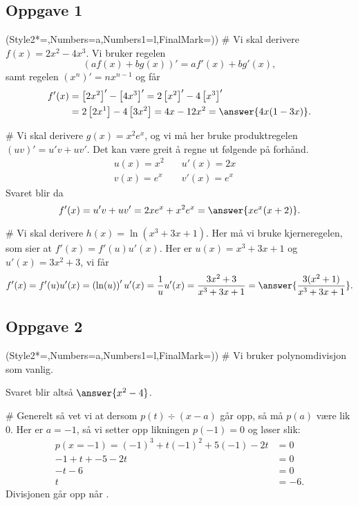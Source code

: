 \subsection*{Oppgave 1}
\begin{easylist}[enumerate]
\ListProperties(Style2*=,Numbers=a,Numbers1=l,FinalMark={)})
# Vi skal derivere $f(x) = 2x^2 - 4x^3$.
Vi bruker regelen
\begin{equation*}
	(af(x) + bg(x))' = a f'(x) + b g'(x),
\end{equation*}
samt regelen $(x^n)' = nx^{n-1}$ og får
\begin{align*}
	f'(x) &= \left[ 2x^2 \right]' - \left[ 4x^3\right]' = 
	2\left[ x^2 \right]' - 4 \left[x^3 \right]' \\ 
	&= 2\left[ 2 x^1 \right] - 4 \left[3 x^2 \right] = 
	4x - 12 x^2 = \answer{4x (1 - 3x)}.
\end{align*}

# Vi skal derivere $g(x) = x^2 e^x$, og vi må her bruke produktregelen $(uv)' = u'v + uv'$. Det kan være greit å regne ut følgende på forhånd.
\begin{align*}
	u(x) = x^2 \quad & u'(x) = 2x \quad \\ 
	v(x) = e^x \quad & v'(x) = e^x \quad 
\end{align*}
Svaret blir da
\begin{equation*}
	f'(x) = u'v + uv' = 2x e^x + x^2e^x = \answer{xe^x (x + 2)}.
\end{equation*}

# Vi skal derivere $h(x) = \ln \left(x^3 + 3x + 1\right)$.
Her må vi bruke kjerneregelen, som sier at $f'(x) = f'(u) u'(x)$.
Her er $u(x) = x^3 + 3x + 1$ og $u'(x) = 3x^2 + 3$, vi får
\begin{equation*}
	f'(x) = f'(u) u'(x) = \left( \ln (u)\right)' u'(x) = \frac{1}{u} u'(x) =
	\frac{3x^2 + 3}{x^3 + 3x + 1} = \answer{\frac{3(x^2 + 1)}{x^3 + 3x + 1}}.
\end{equation*}
\end{easylist}

\subsection*{Oppgave 2}
\begin{easylist}[enumerate]
\ListProperties(Style2*=,Numbers=a,Numbers1=l,FinalMark={)})
# Vi bruker polynomdivisjon som vanlig.
\begin{center}
\end{center}
Svaret blir altså $\answer{x^2 - 4}$.


# Generelt så vet vi at dersom $p(t) \div (x - a)$ går opp, så må $p(a)$ være lik $ 0$.
Her er $a = -1$, så vi setter opp likningen $p(-1) = 0$ og løser slik:
\begin{align*}
	p(x = -1) = (-1)^3 + t(-1)^2 + 5(-1) - 2t &= 0 \\
	 -1 + t + -5 - 2t &= 0 \\
	 -t - 6 &= 0 \\
	  t &= -6.
\end{align*}
Divisjonen går opp når .
\end{easylist}

